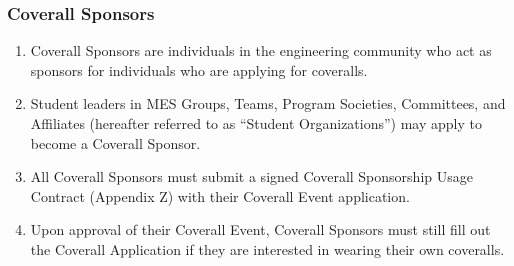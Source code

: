 \subsubsection{Coverall Sponsors}
\label{coverall-sponsors}

\begin{enumerate}
 \item
  Coverall Sponsors are individuals in the engineering community who act as sponsors for individuals who are applying for coveralls.
 \item
  Student leaders in MES Groups, Teams, Program Societies, Committees, and Affiliates (hereafter referred to as ``Student Organizations'') may apply to become a Coverall Sponsor.
 \item
  All Coverall Sponsors must submit a signed Coverall Sponsorship Usage Contract (Appendix Z) with their Coverall Event application.
 \item
  Upon approval of their Coverall Event, Coverall Sponsors must still fill out the Coverall Application if they are interested in wearing their own coveralls.

\end{enumerate}
